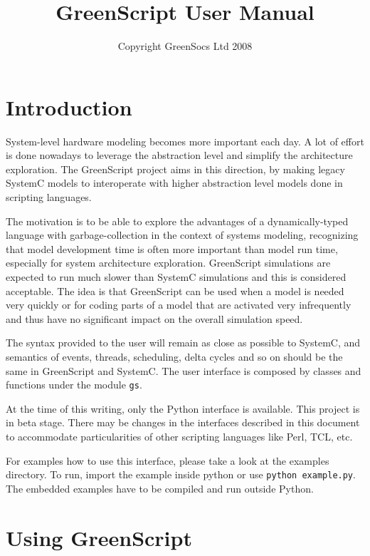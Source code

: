 \documentclass[12pt,oneside]{gsbook}
\author{Copyright GreenSocs Ltd 2008}
\title{GreenScript User Manual}
\begin{document}
\maketitle
\tableofcontents



\chapter{Introduction}
\label{INTRO}

System-level hardware modeling becomes more important each day. A lot
of effort is done nowadays to leverage the abstraction level and
simplify the architecture exploration. The GreenScript project aims in
this direction, by making legacy SystemC models to interoperate with
higher abstraction level models done in scripting languages.

The motivation is to be able to explore the advantages of a
dynamically-typed language with garbage-collection in the context of
systems modeling, recognizing that model development time is often
more important than model run time, especially for system architecture
exploration. GreenScript simulations are expected to run much slower
than SystemC simulations and this is considered acceptable.  The idea
is that GreenScript can be used when a model is needed very quickly or
for coding parts of a model that are activated very infrequently and
thus have no significant impact on the overall simulation speed.

The syntax provided to the user will remain as close as possible to
SystemC, and semantics of events, threads, scheduling, delta cycles
and so on should be the same in GreenScript and SystemC. The user
interface is composed by classes and functions under the module
\texttt{gs}.

At the time of this writing, only the Python interface is
available. This project is in beta stage. There may be changes in the
interfaces described in this document to accommodate particularities
of other scripting languages like Perl, TCL, etc.

For examples how to use this interface, please take a look at the
examples directory. To run, import the example inside python or use
\texttt{python example.py}. The embedded examples have to be compiled
and run outside Python.




\chapter{Using GreenScript}
\label{MODES}
\end{document}
